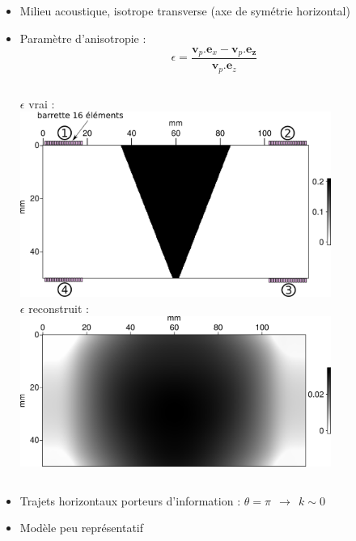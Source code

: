 \documentclass[10pt,xcolor=x11names,compress, notes=show]{beamer}%
\begin{document}
\subsection*{}
\begin{frame}{\insertsectionhead}
		\centering
		\begin{itemize}
			\item  Milieu acoustique, isotrope transverse (axe de symétrie horizontal)
			\item Paramètre d'anisotropie :
		\begin{equation*}
			\epsilon = \frac{\bm{v}_{p}.\bm{e}_{x}-\bm{v}_{p}.\bm{e_{z}}}{\bm{v}_{p}.\bm{e}_{z}}
		\end{equation*}
	\vspace{-0.5cm}
	\begin{columns}
		\centering
		$\epsilon$ vrai : \\[0.2cm]
		\includegraphics[width=0.8\textwidth]{img/anisotrope/epsilon_true.png}\\
		
		\centering
		$\epsilon$ reconstruit : \\[0.2cm]
		\includegraphics[width=0.8\textwidth]{img/anisotrope/epsilon_final.png}\\
	\end{columns}
	\vspace{0.3cm}
	\item Trajets horizontaux porteurs d'information : $\theta=\pi~~\rightarrow~~k\sim 0$
	\item Modèle peu représentatif
	

\end{itemize}
\end{frame}
\end{document}
